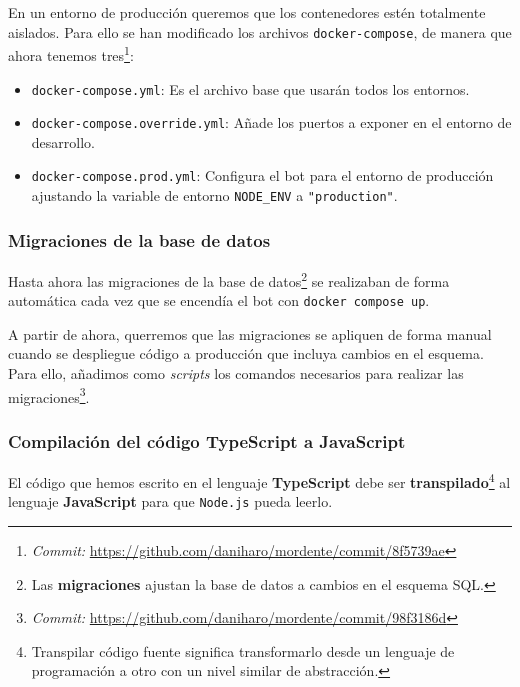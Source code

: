 En un entorno de producción queremos que los contenedores estén totalmente aislados. Para ello se han modificado los archivos \texttt{docker-compose}, de manera que ahora tenemos tres\footnote{\textit{Commit:} \url{https://github.com/daniharo/mordente/commit/8f5739ae}}:

\begin{itemize}
    \item \texttt{docker-compose.yml}: Es el archivo base que usarán todos los entornos.
    \item \texttt{docker-compose.override.yml}: Añade los puertos a exponer en el entorno de desarrollo.
    \item \texttt{docker-compose.prod.yml}: Configura el bot para el entorno de producción ajustando la variable de entorno \texttt{NODE\_ENV} a \texttt{"production"}.
\end{itemize}


\subsubsection{Migraciones de la base de datos}

Hasta ahora las migraciones de la base de datos\footnote{Las \textbf{migraciones} ajustan la base de datos a cambios en el esquema SQL.} se realizaban de forma automática cada vez que se encendía el bot con \texttt{docker compose up}.

A partir de ahora, querremos que las migraciones se apliquen de forma manual cuando se despliegue código a producción que incluya cambios en el esquema. Para ello, añadimos como \textit{scripts} los comandos necesarios para realizar las migraciones\footnote{\textit{Commit:} \url{https://github.com/daniharo/mordente/commit/98f3186d}}.


\subsubsection{Compilación del código TypeScript a JavaScript}

El código que hemos escrito en el lenguaje \textbf{TypeScript} debe ser \textbf{transpilado}\footnote{Transpilar código fuente significa transformarlo desde un lenguaje de programación a otro con un nivel similar de abstracción\cite{whatIsTranspiler}.} al lenguaje \textbf{JavaScript} para que \texttt{Node.js} pueda leerlo.

